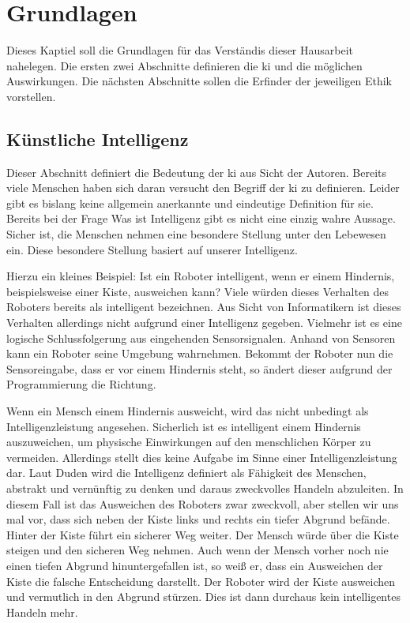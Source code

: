 \section{Grundlagen}
Dieses Kaptiel soll die Grundlagen für das Verständis dieser Hausarbeit nahelegen. Die ersten zwei Abschnitte definieren die \ac{ki} und die möglichen Auswirkungen. Die nächsten Abschnitte sollen die \flqq Erfinder\frqq{} der jeweiligen Ethik vorstellen. 

\subsection{Künstliche Intelligenz}
Dieser Abschnitt definiert die Bedeutung der \ac{ki} aus Sicht der Autoren. Bereits viele Menschen haben sich daran versucht den Begriff der \ac{ki} zu definieren. Leider gibt es bislang keine allgemein anerkannte und eindeutige Definition für sie. Bereits bei der Frage \flqq Was ist Intelligenz\frqq{} gibt es nicht eine einzig wahre Aussage. Sicher ist, die Menschen nehmen eine besondere Stellung unter den Lebewesen ein. Diese besondere Stellung basiert auf unserer Intelligenz.

Hierzu ein kleines Beispiel: Ist ein Roboter intelligent, wenn er einem Hindernis, beispielsweise einer Kiste, ausweichen kann?  Viele würden dieses Verhalten des Roboters bereits als intelligent bezeichnen. Aus Sicht von Informatikern ist dieses Verhalten allerdings nicht aufgrund einer Intelligenz gegeben. Vielmehr ist es eine logische Schlussfolgerung aus eingehenden Sensorsignalen. Anhand von Sensoren kann ein Roboter seine Umgebung wahrnehmen. Bekommt der Roboter nun die Sensoreingabe, dass er vor einem Hindernis steht, so ändert dieser aufgrund der Programmierung die Richtung. 

Wenn ein Mensch einem Hindernis ausweicht, wird das nicht unbedingt als Intelligenzleistung angesehen. Sicherlich ist es intelligent einem Hindernis auszuweichen, um physische Einwirkungen auf den menschlichen Körper zu vermeiden. Allerdings stellt dies keine Aufgabe im Sinne einer Intelligenzleistung dar. Laut Duden wird die Intelligenz definiert als \flqq Fähigkeit des Menschen, abstrakt und vernünftig zu denken und daraus zweckvolles Handeln abzuleiten\frqq. %
In diesem Fall ist das Ausweichen des Roboters zwar zweckvoll, aber stellen wir uns mal vor, dass sich neben der Kiste links und rechts ein tiefer Abgrund befände. Hinter der Kiste führt ein sicherer Weg weiter. Der Mensch würde über die Kiste steigen und den sicheren Weg nehmen. Auch wenn der Mensch vorher noch nie einen tiefen Abgrund hinuntergefallen ist, so weiß er, dass ein Ausweichen der Kiste die falsche Entscheidung darstellt. Der Roboter  wird der Kiste ausweichen und vermutlich in den Abgrund stürzen. Dies ist dann durchaus kein intelligentes Handeln mehr. 

